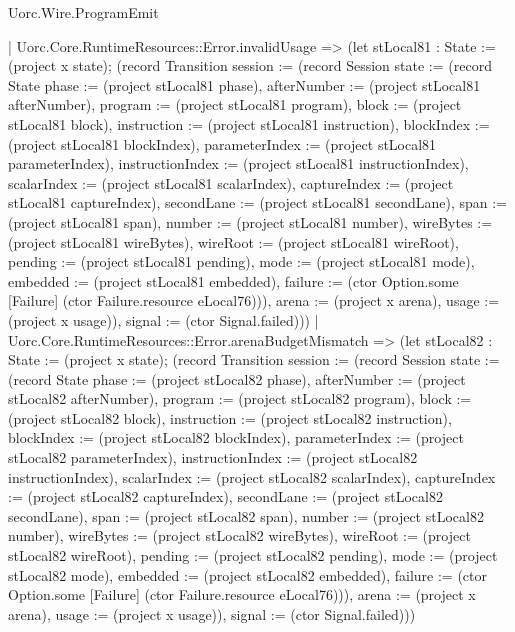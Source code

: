 \begin{lexlean}{Uorc.Wire.ProgramEmit}
\begin{semanticmodule}
{      | Uorc.Core.RuntimeResources::Error.invalidUsage => (let stLocal81 : State := (project x state); (record Transition {session := (record Session {state := (record State {phase := (project stLocal81 phase), afterNumber := (project stLocal81 afterNumber), program := (project stLocal81 program), block := (project stLocal81 block), instruction := (project stLocal81 instruction), blockIndex := (project stLocal81 blockIndex), parameterIndex := (project stLocal81 parameterIndex), instructionIndex := (project stLocal81 instructionIndex), scalarIndex := (project stLocal81 scalarIndex), captureIndex := (project stLocal81 captureIndex), secondLane := (project stLocal81 secondLane), span := (project stLocal81 span), number := (project stLocal81 number), wireBytes := (project stLocal81 wireBytes), wireRoot := (project stLocal81 wireRoot), pending := (project stLocal81 pending), mode := (project stLocal81 mode), embedded := (project stLocal81 embedded), failure := (ctor Option.some [Failure] (ctor Failure.resource eLocal76))}), arena := (project x arena), usage := (project x usage)}), signal := (ctor Signal.failed)}))
      | Uorc.Core.RuntimeResources::Error.arenaBudgetMismatch => (let stLocal82 : State := (project x state); (record Transition {session := (record Session {state := (record State {phase := (project stLocal82 phase), afterNumber := (project stLocal82 afterNumber), program := (project stLocal82 program), block := (project stLocal82 block), instruction := (project stLocal82 instruction), blockIndex := (project stLocal82 blockIndex), parameterIndex := (project stLocal82 parameterIndex), instructionIndex := (project stLocal82 instructionIndex), scalarIndex := (project stLocal82 scalarIndex), captureIndex := (project stLocal82 captureIndex), secondLane := (project stLocal82 secondLane), span := (project stLocal82 span), number := (project stLocal82 number), wireBytes := (project stLocal82 wireBytes), wireRoot := (project stLocal82 wireRoot), pending := (project stLocal82 pending), mode := (project stLocal82 mode), embedded := (project stLocal82 embedded), failure := (ctor Option.some [Failure] (ctor Failure.resource eLocal76))}), arena := (project x arena), usage := (project x usage)}), signal := (ctor Signal.failed)}))
}
\end{semanticmodule}
\end{lexlean}
